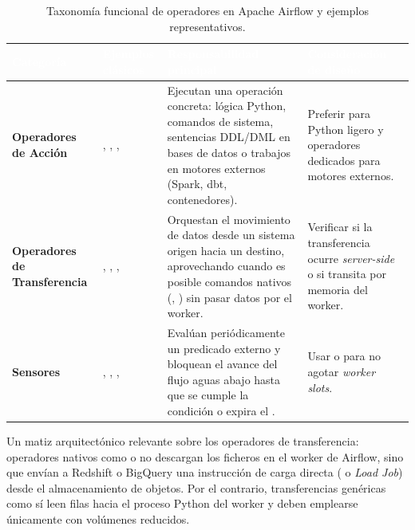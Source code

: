 \begin{table}[htbp]
\centering
\caption{Taxonomía funcional de operadores en Apache Airflow y ejemplos representativos.}
\label{tab:taxonomia-operadores}
\small
\begin{tabularx}{\textwidth}{@{}L{2.8cm} L{4.1cm} Y L{3.3cm}@{}}
\toprule
{}
\textcolor{white}{\sffamily\bfseries Categoría} &
\textcolor{white}{\sffamily\bfseries Ejemplos clásicos} &
\textcolor{white}{\sffamily\bfseries Responsabilidad principal} &
\textcolor{white}{\sffamily\bfseries Consideración de diseño} \\
\midrule
\textbf{Operadores de Acción} &
, , ,  &
Ejecutan una operación concreta: lógica Python, comandos de sistema, sentencias DDL/DML en bases de datos o trabajos en motores externos (Spark, dbt, contenedores). &
Preferir  para Python ligero y operadores dedicados para motores externos. \\
\textbf{Operadores de Transferencia} &
, , ,  &
Orquestan el movimiento de datos desde un sistema origen hacia un destino, aprovechando cuando es posible comandos nativos (, ) sin pasar datos por el worker. &
Verificar si la transferencia ocurre \textit{server-side} o si transita por memoria del worker. \\
\textbf{Sensores} &
, , ,  &
Evalúan periódicamente un predicado externo y bloquean el avance del flujo aguas abajo hasta que se cumple la condición o expira el . &
Usar  o  para no agotar \textit{worker slots}. \\
\bottomrule
\end{tabularx}
\end{table}

Un matiz arquitectónico relevante sobre los operadores de transferencia: operadores nativos como  o  no descargan los ficheros en el worker de Airflow, sino que envían a Redshift o BigQuery una instrucción de carga directa ( o \textit{Load Job}) desde el almacenamiento de objetos. Por el contrario, transferencias genéricas como  sí leen filas hacia el proceso Python del worker y deben emplearse únicamente con volúmenes reducidos.

